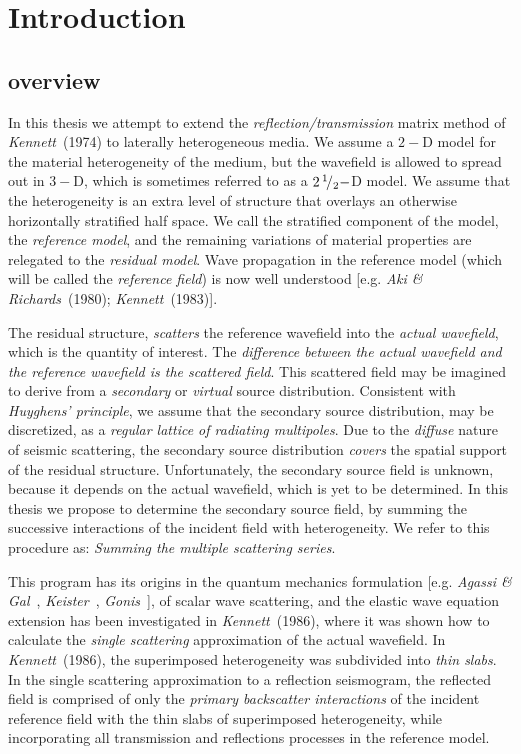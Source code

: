 \chapter{Introduction}

\section{overview}
In this thesis we attempt to extend the {\em reflection/transmission\/} 
matrix method of {\em Kennett\/}~(1974) to laterally heterogeneous media. 
We assume a $2-$D model for the material heterogeneity of the medium, but 
the wavefield is allowed to spread out in $3-$D, which is
sometimes referred to as a $2 \hbox{$\,^1\!/_2$}-$D model. We assume that 
the heterogeneity is an extra level of structure that overlays an otherwise
horizontally stratified half space. We call the stratified component of 
the model, the {\em reference model\/}, and the remaining variations of 
material properties are relegated to the {\em residual model\/}. Wave 
propagation in the reference model (which will be called the {\em 
reference field\/}) is now well understood [e.g. {\em Aki \& 
Richards\/}~(1980); {\em Kennett\/}~(1983)].

The residual structure, {\em scatters\/} the reference wavefield into the 
{\em actual wavefield\/}, which is the quantity of interest. The 
{\em difference between the actual wavefield and the reference wavefield 
is the scattered field\/}.  This scattered field may be imagined to 
derive from  a {\em secondary\/} or {\em virtual\/} source distribution.
Consistent with {\em Huyghens' principle\/}, we assume
that the secondary source distribution, may 
be discretized, as a {\em regular lattice of radiating multipoles\/}.
 Due 
to the {\em diffuse\/} nature of seismic scattering, the secondary source 
distribution {\em covers\/} the spatial support of the residual structure.
Unfortunately, the secondary source field is unknown, 
because it depends  on the actual wavefield, which is yet to be determined. 
In this thesis we propose to determine the secondary source field,  by
summing the successive interactions of the incident field with 
heterogeneity. We refer to this procedure as: {\em Summing the multiple 
scattering series\/}.

This program has its origins in the quantum mechanics formulation
[e.g. {\em Agassi \& Gal\/}~,
{\em Keister\/}~, {\em Gonis\/}~],
of scalar wave scattering,
and the elastic wave equation extension has been investigated in {\em 
Kennett\/}~(1986), where it was shown how to calculate the {\em single 
scattering\/} approximation of the actual wavefield. In {\em 
Kennett\/}~(1986), the superimposed heterogeneity was subdivided into 
{\em thin slabs\/}. In the single scattering approximation to a 
reflection seismogram, the reflected field is comprised of only the {\em 
primary backscatter interactions\/} of the incident reference field with 
the thin slabs of superimposed 
heterogeneity, while incorporating all transmission and reflections processes 
in the reference model.

